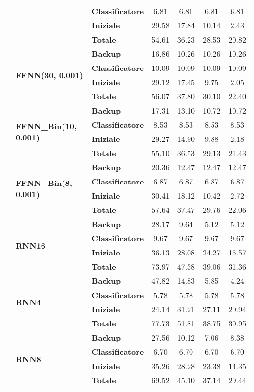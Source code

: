 \begin{table}[H]
\begin{tabular}{|l|l|l|c|c|c|c|}
     &      & \textbf{Classificatore} &  6.81 &  6.81 &  6.81 &  6.81 \\
     &      & \textbf{Iniziale} & 29.58 & 17.84 & 10.14 &  2.43 \\
     &      & \textbf{Totale} & 54.61 & 36.23 & 28.53 & 20.82 \\
\cline{2-7}
     & \multirow{4}{*}{\textbf{FFNN(30, 0.001)}} & \textbf{Backup} & 16.86 & 10.26 & 10.26 & 10.26 \\
     &      & \textbf{Classificatore} & 10.09 & 10.09 & 10.09 & 10.09 \\
     &      & \textbf{Iniziale} & 29.12 & 17.45 &  9.75 &  2.05 \\
     &      & \textbf{Totale} & 56.07 & 37.80 & 30.10 & 22.40 \\
\cline{2-7}
     & \multirow{4}{*}{\textbf{FFNN\_Bin(10, 0.001)}} & \textbf{Backup} & 17.31 & 13.10 & 10.72 & 10.72 \\
     &      & \textbf{Classificatore} &  8.53 &  8.53 &  8.53 &  8.53 \\
     &      & \textbf{Iniziale} & 29.27 & 14.90 &  9.88 &  2.18 \\
     &      & \textbf{Totale} & 55.10 & 36.53 & 29.13 & 21.43 \\
\cline{2-7}
     & \multirow{4}{*}{\textbf{FFNN\_Bin(8, 0.001)}} & \textbf{Backup} & 20.36 & 12.47 & 12.47 & 12.47 \\
     &      & \textbf{Classificatore} &  6.87 &  6.87 &  6.87 &  6.87 \\
     &      & \textbf{Iniziale} & 30.41 & 18.12 & 10.42 &  2.72 \\
     &      & \textbf{Totale} & 57.64 & 37.47 & 29.76 & 22.06 \\
\cline{2-7}
     & \multirow{4}{*}{\textbf{RNN16}} & \textbf{Backup} & 28.17 &  9.64 &  5.12 &  5.12 \\
     &      & \textbf{Classificatore} &  9.67 &  9.67 &  9.67 &  9.67 \\
     &      & \textbf{Iniziale} & 36.13 & 28.08 & 24.27 & 16.57 \\
     &      & \textbf{Totale} & 73.97 & 47.38 & 39.06 & 31.36 \\
\cline{2-7}
     & \multirow{4}{*}{\textbf{RNN4}} & \textbf{Backup} & 47.82 & 14.83 &  5.85 &  4.24 \\
     &      & \textbf{Classificatore} &  5.78 &  5.78 &  5.78 &  5.78 \\
     &      & \textbf{Iniziale} & 24.14 & 31.21 & 27.11 & 20.94 \\
     &      & \textbf{Totale} & 77.73 & 51.81 & 38.75 & 30.95 \\
\cline{2-7}
     & \multirow{4}{*}{\textbf{RNN8}} & \textbf{Backup} & 27.56 & 10.12 &  7.06 &  8.38 \\
     &      & \textbf{Classificatore} &  6.70 &  6.70 &  6.70 &  6.70 \\
     &      & \textbf{Iniziale} & 35.26 & 28.28 & 23.38 & 14.35 \\
     &      & \textbf{Totale} & 69.52 & 45.10 & 37.14 & 29.44 \\
\hline
\end{tabular}
\end{table}
